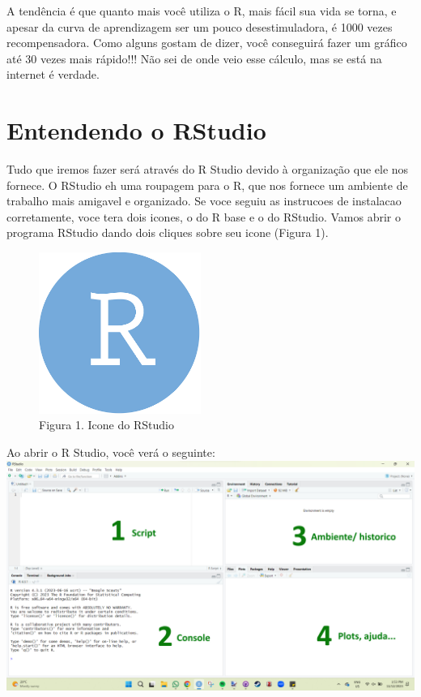 \documentclass[
]{book}
\begin{document}
A tendência é que quanto mais você utiliza o R, mais fácil sua vida se torna, e apesar da curva de aprendizagem ser um pouco desestimuladora, é 1000 vezes recompensadora. Como alguns gostam de dizer, você conseguirá fazer um gráfico até 30 vezes mais rápido!!! Não sei de onde veio esse cálculo, mas se está na internet é verdade.

\hypertarget{entendendo-o-rstudio}{%
\section{Entendendo o RStudio}\label{entendendo-o-rstudio}}

Tudo que iremos fazer será através do R Studio devido à organização que ele nos fornece. O RStudio eh uma roupagem para o R, que nos fornece um ambiente de trabalho mais amigavel e organizado. Se voce seguiu as instrucoes de instalacao corretamente, voce tera dois icones, o do R base e o do RStudio. Vamos abrir o programa RStudio dando dois cliques sobre seu icone (Figura 1).

\begin{figure}
\centering
\includegraphics[width=2.08333in,height=\textheight]{img/rstudio_logo.png}
\caption{Figura 1. Icone do RStudio}
\end{figure}

Ao abrir o R Studio, você verá o seguinte:
\includegraphics{img/cara_do_rstudio1.png}
\end{document}
